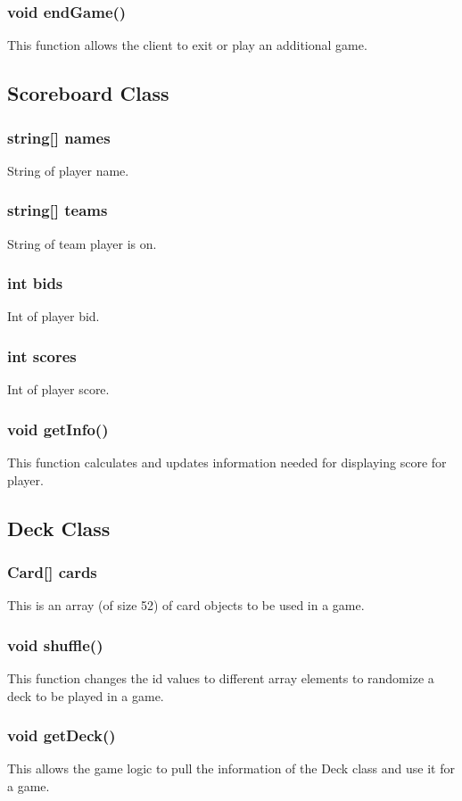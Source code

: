 \subsubsection{void endGame()}
	This function allows the client to exit or play an additional game.

\subsection{Scoreboard Class}

\subsubsection{string[] names}
	String of player name.
\subsubsection{string[] teams}
	String of team player is on.
\subsubsection{int bids}
	Int of player bid.
\subsubsection{int scores}
	Int of player score.
\subsubsection{void getInfo()}
	This function calculates and updates information needed for displaying score for player.

\subsection{Deck Class}

\subsubsection{Card[] cards}
	This is an array (of size 52) of card objects to be used in a game.
\subsubsection{void shuffle()}
	This function changes the id values to different array elements to randomize a deck to be played in a game.
\subsubsection{void getDeck()}
	This allows the game logic to pull the information of the Deck class and use it for a game.

